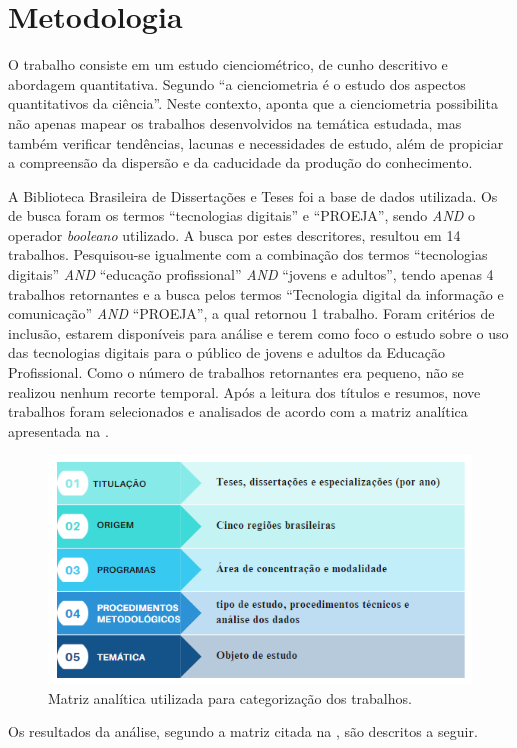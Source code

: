 \section{Metodologia}\label{sec-metodologia}

O trabalho consiste em um estudo cienciométrico, de cunho descritivo e
abordagem quantitativa. Segundo \textcite{Macias-chapula1998} ``a cienciometria
é o estudo dos aspectos quantitativos da ciência''. Neste contexto,
\textcite{spinak1998} aponta que a cienciometria possibilita não apenas mapear
os trabalhos desenvolvidos na temática estudada, mas também verificar
tendências, lacunas e necessidades de estudo, além de propiciar a
compreensão da dispersão e da caducidade da produção do conhecimento.

A Biblioteca Brasileira de Dissertações e Teses foi a base de dados
utilizada. Os de busca foram os termos ``tecnologias digitais'' e
``PROEJA'', sendo \emph{AND} o operador \emph{booleano} utilizado. A
busca por estes descritores, resultou em 14 trabalhos. Pesquisou-se
igualmente com a combinação dos termos ``tecnologias digitais''
\emph{AND} ``educação profissional'' \emph{AND} ``jovens e adultos'',
tendo apenas 4 trabalhos retornantes e a busca pelos termos ``Tecnologia
digital da informação e comunicação'' \emph{AND} ``PROEJA'', a qual
retornou 1 trabalho. Foram critérios de inclusão, estarem disponíveis
para análise e terem como foco o estudo sobre o uso das tecnologias
digitais para o público de jovens e adultos da Educação Profissional.
Como o número de trabalhos retornantes era pequeno, não se realizou
nenhum recorte temporal. Após a leitura dos títulos e resumos, nove
trabalhos foram selecionados e analisados de acordo com a matriz
analítica apresentada na .


\begin{figure}[htpb]
\centering
\begin{minipage}{.75\textwidth}
\caption{Matriz analítica utilizada para categorização dos trabalhos.}\label{fig1}
\includegraphics[width=\textwidth]{Fig1.png}
\end{minipage}
\end{figure}


Os resultados da análise, segundo a matriz citada na , são
descritos a seguir.
